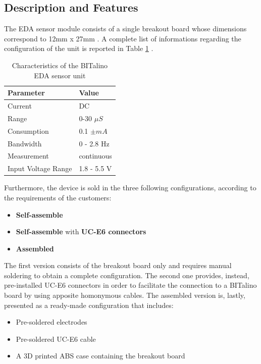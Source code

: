 \subsection{Description and Features}\label{subsec:bitalino-features}

The EDA sensor module consists of a single breakout board whose dimensions correspond to 12mm x 27mm \cite{bitalino-general}. A complete list of informations regarding the configuration of the unit is reported in Table \ref{toc:bitalino-features} .

\begin{table}[H]
\centering
\begin{tabular}{ll}
    \hline
    Parameter               & Value \\
    \hline
    Current                 & DC \\
    Range                   & 0-30 $\mu S$ \\
    Consumption             & 0.1 $\pm mA$ \\
    Bandwidth               & 0 - 2.8 Hz \\
    Measurement             & continuous \\
    Input Voltage Range     & 1.8 - 5.5 V \\
    \hline
\end{tabular}
\caption{Characteristics of the BITalino EDA sensor unit}
\label{toc:bitalino-features}
\end{table}

Furthermore, the device is sold in the three following configurations, according to the requirements of the customers: 
\begin{itemize}
    \item \textbf{Self-assemble}
    \item \textbf{Self-assemble} with \textbf{UC-E6 connectors}
    \item \textbf{Assembled}
\end{itemize}

\vspace{3mm}

The first version consists of the breakout board only and requires manual soldering to obtain a complete configuration. The second one provides, instead, pre-installed UC-E6 connectors in order to facilitate the connection to a BITalino board by using apposite homonymous cables. The assembled version is, lastly, presented as a ready-made configuration that includes: 

\begin{itemize}
    \item Pre-soldered electrodes
    \item Pre-soldered UC-E6 cable
    \item A 3D printed ABS case containing the breakout board
\end{itemize}

